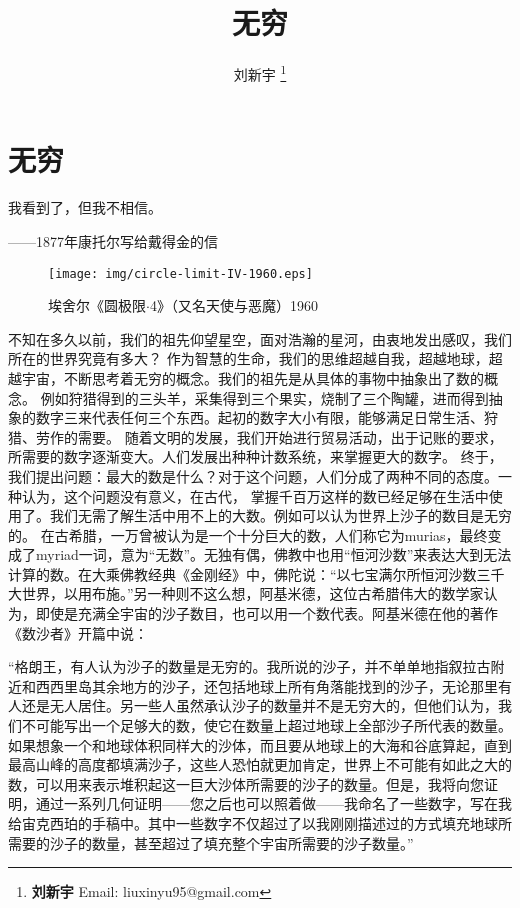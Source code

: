 \documentclass{article}
\begin{document}
\title{无穷}

\author{刘新宇
\thanks{{\bfseries 刘新宇} \newline
  Email: liuxinyu95@gmail.com \newline}
  }

\maketitle
\fi


\ifx\wholebook\relax
\chapter{无穷}
\fi

\epigraph{我看到了，但我不相信。}{——1877年康托尔写给戴得金的信}


\begin{wrapfigure}{R}{0.5\textwidth}
 \centering
 \texttt{[image: img/circle-limit-IV-1960.eps]}
 \captionsetup{labelformat=empty}
 \caption{埃舍尔《圆极限$\cdot$4》（又名天使与恶魔）1960}
 \label{fig:Circle-Limit-IV}
\end{wrapfigure}

不知在多久以前，我们的祖先仰望星空，面对浩瀚的星河，由衷地发出感叹，我们所在的世界究竟有多大？
作为智慧的生命，我们的思维超越自我，超越地球，超越宇宙，不断思考着无穷的概念。我们的祖先是从具体的事物中抽象出了数的概念。
例如狩猎得到的三头羊，采集得到三个果实，烧制了三个陶罐，进而得到抽象的数字三来代表任何三个东西。起初的数字大小有限，能够满足日常生活、狩猎、劳作的需要。
随着文明的发展，我们开始进行贸易活动，出于记账的要求，所需要的数字逐渐变大。人们发展出种种计数系统，来掌握更大的数字。
终于，我们提出问题：最大的数是什么？对于这个问题，人们分成了两种不同的态度。一种认为，这个问题没有意义，在古代，
掌握千百万这样的数已经足够在生活中使用了。我们无需了解生活中用不上的大数。例如可以认为世界上沙子的数目是无穷的。
在古希腊，一万曾被认为是一个十分巨大的数，人们称它为murias，最终变成了myriad一词，意为“无数”\cite{De-linfini-2018}。无独有偶，佛教中也用“恒河沙数”来表达大到无法计算的数。在大乘佛教经典《金刚经》中，佛陀说：“以七宝满尔所恒河沙数三千大世界，以用布施。”另一种则不这么想，阿基米德，这位古希腊伟大的数学家认为，即使是充满全宇宙的沙子数目，也可以用一个数代表。阿基米德在他的著作《数沙者》开篇中说：

“格朗王，有人认为沙子的数量是无穷的。我所说的沙子，并不单单地指叙拉古附近和西西里岛其余地方的沙子，还包括地球上所有角落能找到的沙子，无论那里有人还是无人居住。另一些人虽然承认沙子的数量并不是无穷大的，但他们认为，我们不可能写出一个足够大的数，使它在数量上超过地球上全部沙子所代表的数量。如果想象一个和地球体积同样大的沙体，而且要从地球上的大海和谷底算起，直到最高山峰的高度都填满沙子，这些人恐怕就更加肯定，世界上不可能有如此之大的数，可以用来表示堆积起这一巨大沙体所需要的沙子的数量。但是，我将向您证明，通过一系列几何证明——您之后也可以照着做——我命名了一些数字，写在我给宙克西珀的手稿中。其中一些数字不仅超过了以我刚刚描述过的方式填充地球所需要的沙子的数量，甚至超过了填充整个宇宙所需要的沙子数量。”
\end{document}
